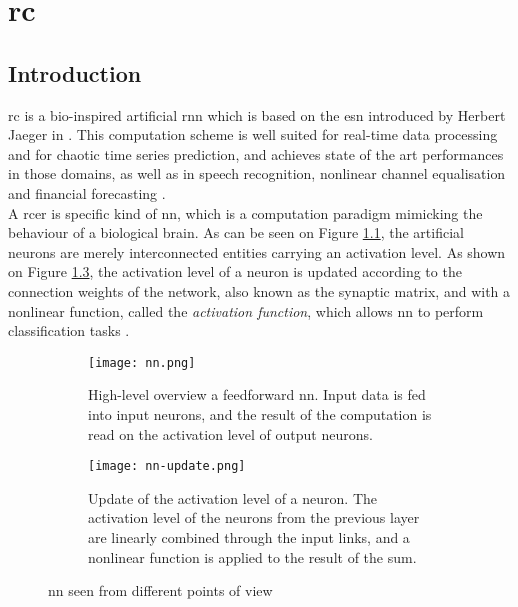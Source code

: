 \chapter{\acrlong{rc}}
\label{rc}

\section{Introduction}


\gls{rc} is a bio-inspired artificial \gls{rnn} which is based on the \gls{esn} introduced by Herbert Jaeger in \cite{Jaeger2004}. This computation scheme is well suited for real-time data processing and for chaotic time series prediction\cite{Jaeger2004, JaegerH.2001Tesa, Lukoeviius2012}, and achieves state of the art performances in those domains, as well as in speech recognition\cite{Verstraeten2006, NIPS2010_4056, Jaeger2007}, nonlinear channel equalisation\cite{Jaeger2004} and financial forecasting \cite{financialTimeSeries}.\\

A \gls{rcer} is specific kind of \gls{nn}, which is a computation paradigm mimicking the behaviour of a biological brain. As can be seen on Figure \ref{nn}, the artificial neurons are merely interconnected entities carrying an activation level. As shown on Figure \ref{nn-update}, the activation level of a neuron is updated according to the connection weights of the network, also known as the synaptic matrix, and with a nonlinear function, called the \textit{activation function}, which allows \gls{nn} to perform classification tasks \cite[p.225]{bishop2006pattern}\cite[p.727]{russell2010artificial}.\\

\begin{figure}[h]
	\centering
	\begin{subfigure}{.5\textwidth}
		\centering
		\texttt{[image: nn.png]}
		\caption{High-level overview a feedforward \gls{nn}. Input data is fed into input neurons, and the result of the computation is read on the activation level of output neurons. \\ \cite[p.228]{bishop2006pattern}}
		\label{nn}
	\end{subfigure}%
	\begin{subfigure}{.5\textwidth}
		\centering
		\texttt{[image: nn-update.png]}
		\caption{Update of the activation level of a neuron. The activation level of the neurons from the previous layer are linearly combined through the input links, and a nonlinear function is applied to the result of the sum.\\ \cite[p.728]{russell2010artificial}}
		\label{nn-update}
	\end{subfigure}
	\caption{\acrlong{nn} seen from different points of view}
\end{figure}

